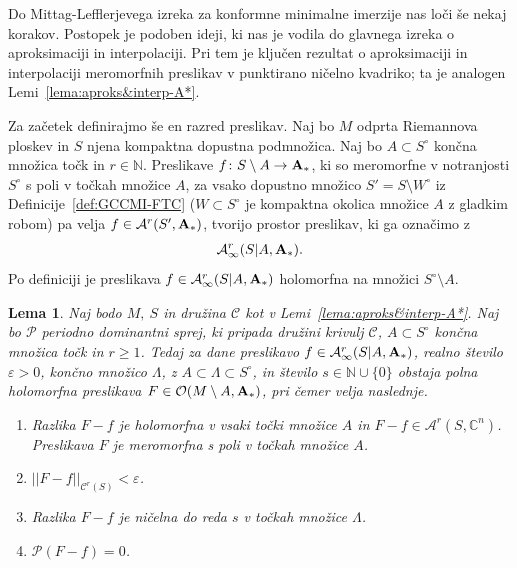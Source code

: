 \documentclass[12pt,a4paper,twoside]{article}
\theoremstyle{definition} %
\theoremstyle{plain} %
\newtheorem{lema}[definicija]{Lema}
\numberwithin{equation}{section}  %
\newcommand{\N}{\mathbb N}
\begin{document}
Do Mittag-Lefflerjevega izreka za konformne minimalne imerzije nas loči še nekaj korakov. Postopek je podoben ideji, ki nas je vodila do glavnega izreka o aproksimaciji in interpolaciji. Pri tem je ključen rezultat o aproksimaciji in interpolaciji meromorfnih preslikav v punktirano ničelno kvadriko; ta je analogen Lemi~\ref{lema:aproks&interp-A*}.

Za začetek definirajmo še en razred preslikav.
Naj bo $M$ odprta Riemannova ploskev in $S$ njena kompaktna dopustna podmnožica. Naj bo $A \subset S^{\circ}$ končna množica točk in $r \in \N$.
Preslikave $f \colon S \setminus A \to \textup{\textbf{A}}_{*}$, ki so meromorfne v notranjosti $S^{\circ}$ s poli v točkah množice $A$, za vsako dopustno množico $S' = S \setminus W^{\circ}$ iz Definicije~\ref{def:GCCMI-FTC} ($W \subset S^{\circ}$ je kompaktna okolica množice $A$ z gladkim robom) pa velja $f \in \mathcal{A}^{r}(S', \textup{\textbf{A}}_{*})$, tvorijo prostor preslikav, ki ga označimo z 
\begin{gather*}
\mathcal{A}_{\infty}^{r}(S|A, \textup{\textbf{A}}_{*}).
\end{gather*}
Po definiciji je preslikava $f \in \mathcal{A}_{\infty}^{r}(S|A, \textup{\textbf{A}}_{*})$ holomorfna na množici $S^{\circ} \setminus A$.

\begin{lema} \label{lema:ML-pomozna-lema}
Naj bodo $M, \ S$ in družina $\mathcal{C}$ kot v Lemi~\ref{lema:aproks&interp-A*}. Naj bo $\mathcal{P}$ periodno dominantni sprej, ki pripada družini krivulj $\mathcal{C}$, $A \subset S^{\circ}$ končna množica točk in $r \geq 1$.
Tedaj za dane preslikavo $f \in \mathcal{A}_{\infty}^{r}(S|A, \textup{\textbf{A}}_{*})$, realno število $\varepsilon > 0$, končno množico $\Lambda$, z $A \subset \Lambda \subset S^{\circ}$, in število $s \in \mathbb{N} \cup \{0\}$ obstaja polna holomorfna preslikava $F \in \mathcal{O}(M \setminus A, \textup{\textbf{A}}_{*})$, pri čemer velja naslednje.
\begin{enumerate}
\item Razlika $F-f$ je holomorfna v vsaki točki množice $A$ in $F-f \in \mathcal{A}^{r}(S, \mathbb{C}^{n})$. Preslikava $F$ je meromorfna s poli v točkah množice $A$.
\item $ ||F-f||_{\mathcal{C}^{r}(S)} < \varepsilon$.
\item Razlika $F-f$ je ničelna do reda $s$ v točkah množice $\Lambda$.
\item $\mathcal{P}(F-f) = 0$.
\end{enumerate}
\end{lema}
\end{document}
